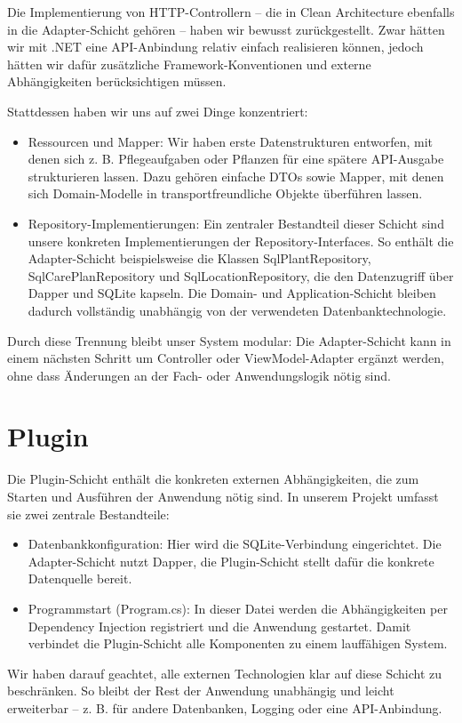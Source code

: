 Die Implementierung von HTTP-Controllern – die in Clean Architecture ebenfalls in die Adapter-Schicht gehören – haben wir bewusst zurückgestellt. Zwar hätten wir mit .NET eine API-Anbindung relativ einfach realisieren können, jedoch hätten wir dafür zusätzliche Framework-Konventionen und externe Abhängigkeiten berücksichtigen müssen.

Stattdessen haben wir uns auf zwei Dinge konzentriert:
\begin{itemize}
    \item Ressourcen und Mapper: Wir haben erste Datenstrukturen entworfen, mit denen sich z. B. Pflegeaufgaben oder Pflanzen für eine spätere API-Ausgabe
strukturieren lassen. Dazu gehören einfache DTOs sowie Mapper, mit denen sich Domain-Modelle in transportfreundliche Objekte überführen lassen.
    \item Repository-Implementierungen: Ein zentraler Bestandteil dieser Schicht sind unsere konkreten Implementierungen der Repository-Interfaces. So
enthält die Adapter-Schicht beispielsweise die Klassen SqlPlantRepository, SqlCarePlanRepository und SqlLocationRepository, die den Datenzugriff
über Dapper und SQLite kapseln. Die Domain- und Application-Schicht bleiben dadurch vollständig unabhängig von der verwendeten
Datenbanktechnologie.
\end{itemize}

Durch diese Trennung bleibt unser System modular: Die Adapter-Schicht kann in einem nächsten Schritt um Controller oder ViewModel-Adapter
ergänzt werden, ohne dass Änderungen an der Fach- oder Anwendungslogik nötig sind.
\section{Plugin}
Die Plugin-Schicht enthält die konkreten externen Abhängigkeiten, die zum Starten und Ausführen der Anwendung nötig sind. In unserem Projekt
umfasst sie zwei zentrale Bestandteile:

\begin{itemize}
    \item Datenbankkonfiguration: Hier wird die SQLite-Verbindung eingerichtet. Die Adapter-Schicht nutzt Dapper, die Plugin-Schicht stellt
    dafür die konkrete Datenquelle bereit.
    \item Programmstart (Program.cs): In dieser Datei werden die Abhängigkeiten per Dependency Injection registriert und die Anwendung gestartet. Damit verbindet die Plugin-Schicht alle Komponenten zu einem lauffähigen System.
\end{itemize}

Wir haben darauf geachtet, alle externen Technologien klar auf diese Schicht zu beschränken. So bleibt der Rest der Anwendung unabhängig und leicht erweiterbar – z. B. für andere Datenbanken, Logging oder eine API-Anbindung.